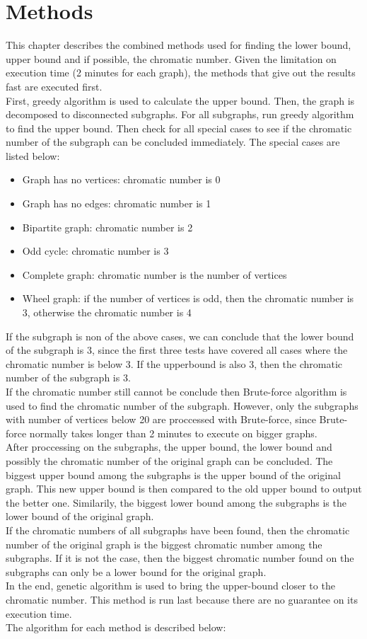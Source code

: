 \documentclass[a4paper]{report}
\begin{document}
	\chapter{Methods}
	This chapter describes the combined methods used for finding the lower bound, upper bound and if possible, the chromatic number. Given the limitation on execution time (2 minutes for each graph), the methods that give out the results fast are executed first. \\
	First, greedy algorithm is used to calculate the upper bound. Then, the graph is decomposed to disconnected subgraphs. For all subgraphs, run greedy algorithm to find the upper bound. Then check for all special cases to see if the chromatic number of the subgraph can be concluded immediately. The special cases are listed below: 
	\begin{itemize}
		\item Graph has no vertices: chromatic number is 0
		\item Graph has no edges: chromatic number is 1
		\item Bipartite graph: chromatic number is 2
		\item Odd cycle: chromatic number is 3
		\item Complete graph: chromatic number is the number of vertices
		\item Wheel graph: if the number of vertices is odd, then the chromatic number is 3, otherwise the chromatic number is 4
	\end{itemize}
	If the subgraph is non of the above cases, we can conclude that the lower bound of the subgraph is 3, since the first three tests have covered all cases where the chromatic number is below 3. If the upperbound is also 3, then the chromatic number of the subgraph is 3. \\
	If the chromatic number still cannot be conclude then Brute-force algorithm is used to find the chromatic number of the subgraph. However, only the subgraphs with number of vertices below 20 are proccessed with Brute-force, since Brute-force normally takes longer than 2 minutes to execute on bigger graphs. \\
	After proccessing on the subgraphs, the upper bound, the lower bound and possibly the chromatic number of the original graph can be concluded. The biggest upper bound among the subgraphs is the upper bound of the original graph. This new upper bound is then compared to the old upper bound to output the better one. Similarily, the biggest lower bound among the subgraphs is the lower bound of the original graph. \\
	If the chromatic numbers of all subgraphs have been found, then the chromatic number of the original graph is the biggest chromatic number among the subgraphs. If it is not the case, then the biggest chromatic number found on the subgraphs can only be a lower bound for the original graph.\\
	In the end, genetic algorithm is used to bring the upper-bound closer to the chromatic number. This method is run last because there are no guarantee on its execution time.\\
	The algorithm for each method is described below: 
	
\end{document}
